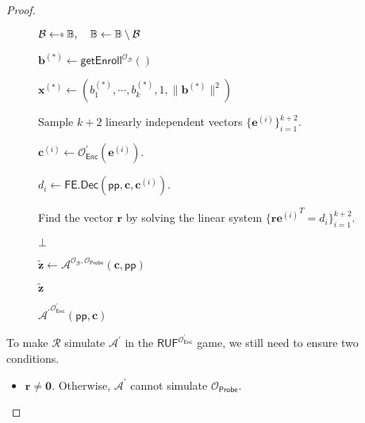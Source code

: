 \begin{proof}
\begin{figure}[h]
\centering
	
	\begin{minipage}[t]{0.8\linewidth}
	\centering
	\begin{algorithm}[H]
	\caption{$ {\mathcal{A}^\prime}^{ \mathcal{O}^\prime_{\textsf{Enc}} } (\textsf{pp}, \mathbf{c}) $}
	\label{alg:adv:ind-uf-OB-Probe}
	\begin{algorithmic}[1]
		\State $\mathcal{B} \getsdollar \mathbb{B}, \quad \mathbb{B} \gets \mathbb{B} \setminus \mathcal{B}$ \label{alg:adv:ind-uf-OB-Probe:B}
		
		\State $\mathbf{b}^{(*)} \gets \textsf{getEnroll}^{ \mathcal{O}_{\mathcal{B}} } ()$
		
		\State $\mathbf{x}^{(*)} \gets (b_1^{(*)}, \cdots, b_k^{(*)}, 1, \|\mathbf{b}^{(*)}\|^2)$

		\State Sample $k+2$ linearly independent vectors $\{ \mathbf{e}^{(i)} \}_{i=1}^{k+2}$.

			\State $\mathbf{c}^{(i)} \gets \mathcal{O}^\prime_{\textsf{Enc}}(\mathbf{e}^{(i)})$.

			\State $d_i \gets \textsf{FE.Dec}(\textsf{pp}, \mathbf{c}, \mathbf{c}^{(i)})$.
		\EndFor

		\State Find the vector $\mathbf{r}$ by solving the linear system $\{ \mathbf{r} {\mathbf{e}^{(i)}}^T = d_i \}_{i=1}^{k+2}$.


			\State \Return $\bot$

		\EndIf

		\State ${\mathbf{\tilde{z}}} \gets \mathcal{A}^{\mathcal{O}_{\mathcal{B}}, \mathcal{O}_{\textsf{Probe}} } ( \mathbf{c}, \textsf{pp})$
		
		\State \Return ${\mathbf{\tilde{z}}}$
	\end{algorithmic}
	\end{algorithm}
	\end{minipage}
	
\end{figure}

To make $\mathcal{R}$ simulate $\mathcal{A}^\prime$ in the $\textsf{RUF}^{ \mathcal{O}^\prime_{\textsf{Enc}} }$ game, we still need to ensure two conditions.

\begin{itemize}

	\item $\mathbf{r} \neq \mathbf{0}$. Otherwise, $\mathcal{A}^\prime$ cannot simulate $\mathcal{O}_\textsf{Probe}$. 


\end{itemize}
\end{proof}
